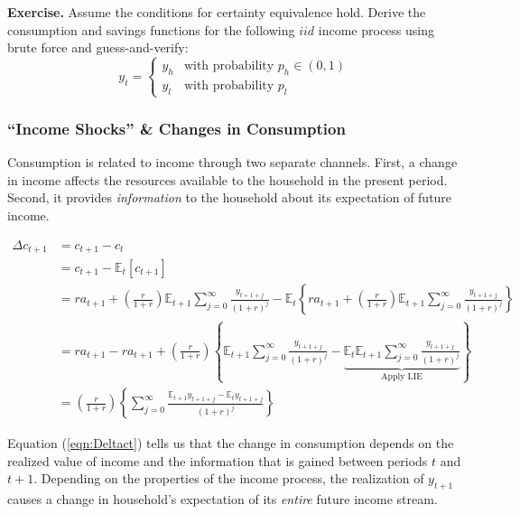 \documentclass[11pt]{article}
\newcommand{\expectation}{\mathbb{E}}
\begin{document}
\noindent
\textbf{Exercise.} Assume the conditions for certainty equivalence hold. Derive the consumption and savings functions for the following $iid$ income process using brute force and guess-and-verify: $$y_t = \begin{cases} y_h & \text{with probability $p_h \in (0,1)$} \\ y_l & \text{with probability $p_l$} \end{cases}$$

\subsubsection{``Income Shocks'' \& Changes in Consumption}
Consumption is related to income through two separate channels. First, a change in income affects the resources available to the household in the present period. Second, it provides \emph{information} to the household about its expectation of future income.

\begin{align}
    \Delta c_{t+1} &= c_{t+1} - c_t \nonumber \\
    &= c_{t+1} - \expectation_t[c_{t+1}] \nonumber \\ 
    &= ra_{t+1} + \left(\frac{r}{1+r}\right) \expectation_{t+1}\sum_{j=0}^\infty \frac{y_{t+1+j}}{(1+r)^j} - \expectation_t\left\{ ra_{t+1} + \left(\frac{r}{1+r}\right) \expectation_{t+1} \sum_{j=0}^\infty \frac{y_{t+1+j}}{(1+r)^j}\right\} \nonumber \\
    &= ra_{t+1} - ra_{t+1} + \left(\frac{r}{1+r}\right) \left\{ \expectation_{t+1} \sum_{j=0}^\infty \frac{y_{t+1+j}}{(1+r)^j} - \underbrace{\expectation_t \expectation_{t+1} \sum_{j=0}^\infty \frac{y_{t+1+j}}{(1+r)^j}}_{\text{Apply LIE}} \right\} \nonumber \\
    &= \left(\frac{r}{1+r}\right) \left\{ \sum_{j=0}^\infty \frac{\expectation_{t+1} y_{t+1+j} - \expectation_t y_{t+1+j}}{(1+r)^j} \right\} \label{eqn:Deltact}
\end{align}

Equation (\ref{eqn:Deltact}) tells us that the change in consumption depends on the realized value of income and the information that is gained between periods $t$ and $t+1$. Depending on the properties of the income process, the realization of $y_{t+1}$ causes a change in household's expectation of its \emph{entire} future income stream.
\end{document}
